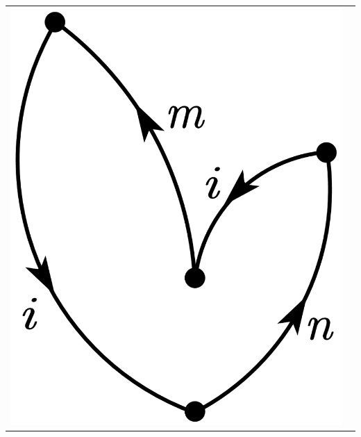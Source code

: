 \documentclass[a4paper]{book}
\newcounter{solution}[chapter]
\begin{document}
\begin{solution}
\begin{center}
\begin{tabular}{cc}
		\begin{minipage}{0.49\linewidth}
		\centering
		\includegraphics[scale=1.0,trim=0 -4 0 -4]{./pictures/6.02/5.png}
		\captionof*{figure}{$(-1)^{2+1} { \sum_{mn} }^\prime \frac{ V_{mi} V_{in} V_{ni} V_{im} }{ ( E^{(0)}_i - E^{(0)}_m ) ( 2E^{(0)}_i - E^{(0)}_m - E^{(0)}_n ) ( E^{(0)}_i - E^{(0)}_n ) }$}
		\end{minipage} &
		

\end{tabular}
\end{center}
\end{solution}
\end{document}

